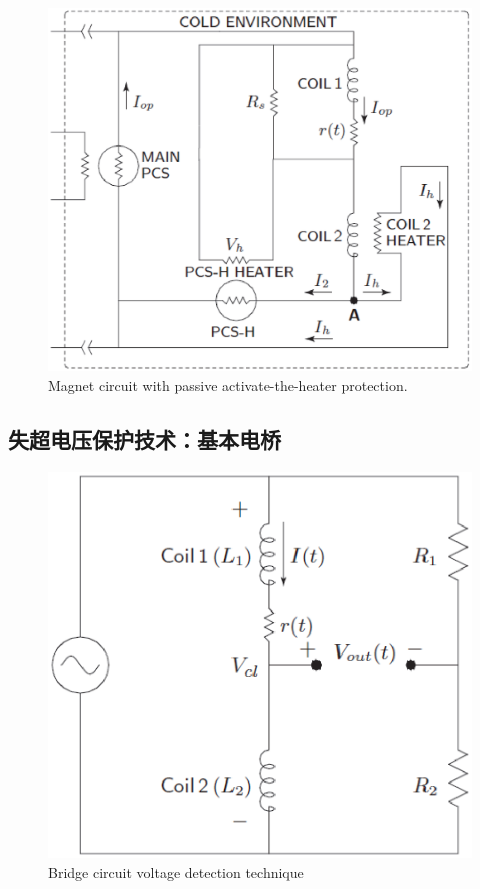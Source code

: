 \begin{figure}
	\centering
	\includegraphics[scale=0.6]{chpt8/figs/fig8.18.eps}
	\caption{Magnet circuit with passive activate-the-heater protection.}
\end{figure}




\subsection{失超电压保护技术：基本电桥}


\begin{figure}
	\centering
	\includegraphics[scale=0.6]{chpt8/figs/fig8.19.eps}
	\caption{Bridge circuit voltage detection technique}
\end{figure}


